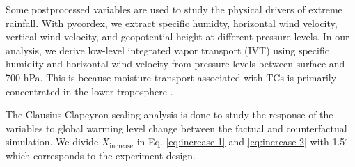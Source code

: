 Some postprocessed variables are used to study the physical drivers of extreme rainfall. With pycordex, we extract specific humidty, horizontal wind velocity, vertical wind velocity, and geopotential height at different pressure levels. In our analysis, we derive low-level integrated vapor transport (IVT) using specific humidity and horizontal wind velocity from pressure levels between surface and 700 hPa. This is because moisture transport associated with TCs is primarily concentrated in the lower troposphere \citep{li2024western}.

The Clausius-Clapeyron scaling analysis is done to study the response of the variables to global warming level change between the factual and counterfactual simulation. We divide $X_{\text{increase}}$ in Eq. \eqref{eq:increase-1} and \eqref{eq:increase-2} with 1.5$^\circ$ which corresponds to the experiment design.